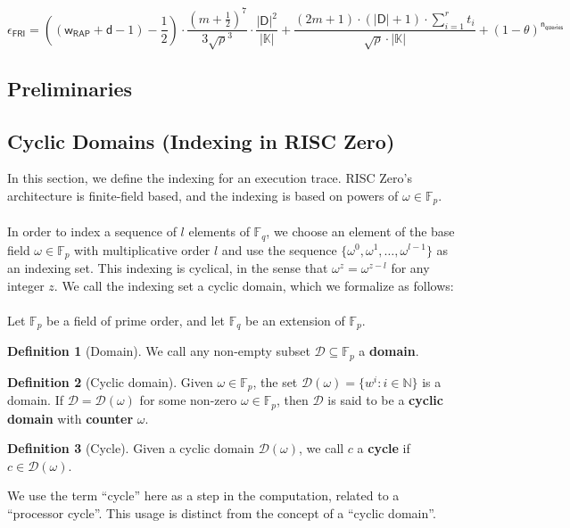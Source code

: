 \documentclass[10pt,letterpaper,titlepage]{article}
\newcommand{\GF}[1]{\mathbb{F}_{#1}}
\newcommand{\w}[0]{\omega}
\newcommand{\D}[0]{\mathcal{D}}
\theoremstyle{definition}
\newtheorem{definition}{Definition}
\begin{document}
\[ 
    \epsilon_\mathsf{FRI} =
    ((\mathsf{w_{RAP}}+\mathsf{d}-1)-\frac{1}{2})\cdot\frac{(m+\frac{1}{2})^7}{3\sqrt{\rho}^3}\cdot\frac{|\mathsf{D}|^2}{|\mathbb{K}|} 
    + 
    \frac{(2m+1)\cdot(|\mathsf{D}|+1)\cdot\sum^r_{i=1}t_i}{\sqrt{\rho}\cdot|\mathbb{K}|}
    +
    (1-\theta)^\mathsf{n_{queries}}
  \]
\pagebreak
\printbibliography
\pagebreak
\begin{appendices}
\section{Preliminaries}
\label{preliminaries}
\subsection{Cyclic Domains (Indexing in RISC Zero)}
\label{sequential time}
\label{cyclic domains}
In this section, we define the indexing for an execution trace. RISC Zero's architecture is finite-field based, and the indexing is based on powers of $\w\in\GF{p}$. \\
\\
In order to index a sequence of $l$ elements of $\GF{q}$, we choose an element of the base field $\w\in\GF{p}$ with multiplicative order $l$ and use the sequence $\{\w^0, \w^1, \ldots, \w^{l-1}\}$ as an indexing set. 
This indexing is cyclical, in the sense that $\w^z=\w^{z-l}$ for any integer $z$. 
We call the indexing set a cyclic domain, which we formalize as follows: \\
\\
Let $\GF{p}$ be a field of prime order, and let $\GF{q}$ be an extension of $\GF{p}$.
\begin{definition}[Domain] 
  We call any non-empty subset $\D\subseteq\GF{p}$ a \textbf{domain}.
\end{definition}
\begin{definition}[Cyclic domain] 
  Given $\w\in\GF{p}$, the set $\D(\omega)=\{w^i:i\in\mathbb{N}\}$ is a domain. 
  If $\D=\D(\w)$ for some non-zero $\w\in\GF{p}$, then $\D$ is said to be a \textbf{cyclic domain} with \textbf{counter} $\w$. 
\end{definition}
\begin{definition}[Cycle]
  Given a cyclic domain $\D(\w)$, we call $c$ a \textbf{cycle} if $c\in\D(\omega)$. 
\end{definition}
\noindent 
We use the term ``cycle'' here as a step in the computation, related to a ``processor cycle''.
This usage is distinct from the concept of a ``cyclic domain''.\\

\end{appendices}
\end{document}
